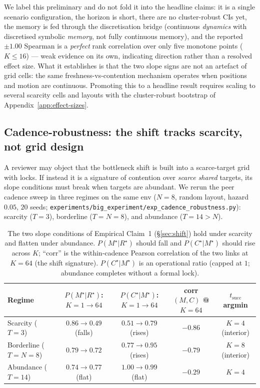 \documentclass{article}
\newcommand{\method}[1]{\texttt{#1}}
\begin{document}
We label this preliminary and do not fold it into the headline claims: it is a
single scenario configuration, the horizon is short, there are no cluster-robust
CIs yet, the memory is fed through the discretisation bridge (continuous
\emph{dynamics} with discretised symbolic \emph{memory}, not fully continuous
memory), and the reported $\pm1.00$ Spearman is a \emph{perfect} rank
correlation over only five monotone points ($K\le16$) --- weak evidence on its
own, indicating direction rather than a resolved effect size. What it establishes is that the two slope signs are not an artefact of
grid cells: the same freshness-vs-contention mechanism operates when positions
and motion are continuous. Promoting this to a headline result requires scaling
to several scarcity cells and layouts with the cluster-robust bootstrap of
Appendix~\ref{app:effect-sizes}.

\subsection{Cadence-robustness: the shift tracks scarcity, not grid design}
\label{app:cadence-robustness}

A reviewer may object that the bottleneck shift is built into a scarce-target
grid with locks. If instead it is a signature of contention over \emph{scarce
shared} targets, its slope conditions must break when targets are abundant. We
rerun the peer cadence sweep in three regimes on the same env ($N{=}8$, random
layout, hazard $0.05$, $20$ seeds; \method{experiments/big\_experiment/exp\_cadence\_robustness.py}):
scarcity ($T{=}3$), borderline ($T{=}N{=}8$), and abundance ($T{=}14{>}N$).

\begin{table}[h]
\caption{The two slope conditions of Empirical Claim~1 (\S\ref{sec:shift}) hold under scarcity and flatten under abundance. $P(M^\star|R^\star)$ should fall and $P(C^\star|M^\star)$ should rise across $K$; ``corr'' is the within-cadence Pearson correlation of the two links at $K{=}64$ (the shift signature). $P(C^\star|M^\star)$ is an operational ratio (capped at $1$; abundance completes without a formal lock).}
\label{tab:cadence-robustness}
\centering
\small
\begin{tabular}{l c c c c}
\toprule
Regime & $P(M^\star|R^\star)$: $K{=}1\!\to\!64$ & $P(C^\star|M^\star)$: $K{=}1\!\to\!64$ & corr$(M,C)$ @ $K{=}64$ & $t_{\mathrm{succ}}$ argmin \\
\midrule
Scarcity ($T{=}3$)      & $0.86 \to 0.49$ (falls) & $0.51 \to 0.79$ (rises) & $-0.86$ & $K{=}4$ (interior) \\
Borderline ($T{=}N{=}8$) & $0.79 \to 0.72$        & $0.77 \to 0.95$ (rises) & $-0.79$ & $K{=}8$ (interior) \\
Abundance ($T{=}14$)    & $0.74 \to 0.77$ (flat)  & $1.00 \to 0.99$ (flat)  & $-0.29$ & $K{=}4$ \\
\bottomrule
\end{tabular}
\end{table}
\end{document}
